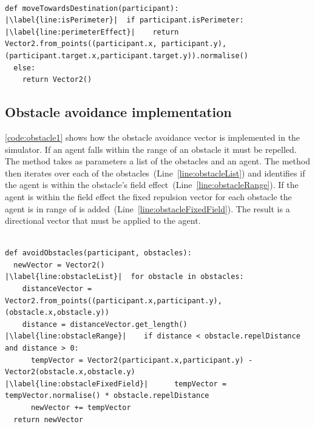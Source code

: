 \lstset{language=Python,
basicstyle=\tiny,
numbers=left, 
numberstyle=\tiny,
captionpos=b,
frame=single,
breaklines=true,
caption=Repulsion code,
escapechar=|
} %
\begin{lstlisting}[label={code:destination1}]  % Start your code-block

def moveTowardsDestination(participant):
|\label{line:isPerimeter}|  if participant.isPerimeter:
|\label{line:perimeterEffect}|    return Vector2.from_points((participant.x, participant.y),(participant.target.x,participant.target.y)).normalise()
  else:
    return Vector2()
\end{lstlisting}

\subsection{Obstacle avoidance implementation}
\autoref{code:obstacle1} shows how the obstacle avoidance vector is implemented in the simulator. If an agent falls within the range of an obstacle it must be repelled. The method takes as parameters a list of the obstacles and an agent. The method then iterates over each of the obstacles~(Line~\autoref{line:obstacleList}) and identifies if the agent is within the obstacle's field effect~(Line~\autoref{line:obstacleRange}). If the agent is within the field effect the fixed repulsion vector for each obstacle the agent is in range of is added~(Line~\autoref{line:obstacleFixedField}). The result is a directional vector that must be applied to the agent.
 
\lstset{language=Python,
basicstyle=\tiny,
numbers=left, 
numberstyle=\tiny,
captionpos=b,
frame=single,
breaklines=true,
caption=Obstacle avoidance code,
escapechar=|
} %
\begin{lstlisting}[label={code:obstacle1}]  % Start your code-block

def avoidObstacles(participant, obstacles):
  newVector = Vector2()
|\label{line:obstacleList}|  for obstacle in obstacles:
    distanceVector = Vector2.from_points((participant.x,participant.y),(obstacle.x,obstacle.y))
    distance = distanceVector.get_length()
|\label{line:obstacleRange}|    if distance < obstacle.repelDistance and distance > 0:
      tempVector = Vector2(participant.x,participant.y) - Vector2(obstacle.x,obstacle.y)
|\label{line:obstacleFixedField}|      tempVector = tempVector.normalise() * obstacle.repelDistance
      newVector += tempVector
  return newVector
\end{lstlisting}

